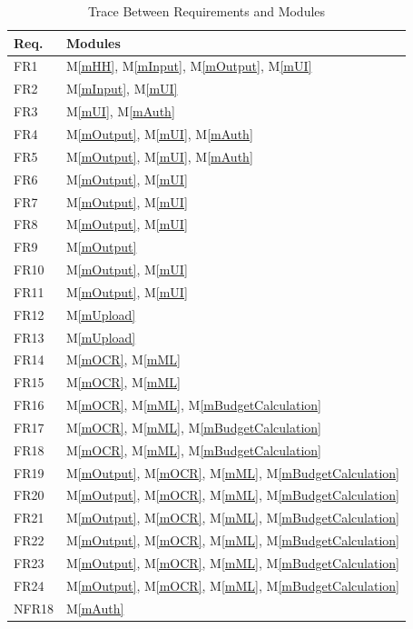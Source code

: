 \documentclass[12pt, titlepage]{article}
\newcommand{\mref}[1]{M\ref{#1}}
\begin{document}
\begin{table}[H]
\caption{Trace Between Requirements and Modules}
\centering
\begin{tabular}{p{} p{}}
\toprule
\textbf{Req.} & \textbf{Modules}\\
\midrule
FR1 & \mref{mHH}, \mref{mInput}, \mref{mOutput}, \mref{mUI}\\
FR2 & \mref{mInput}, \mref{mUI}\\
FR3 & \mref{mUI}, \mref{mAuth}\\
FR4 & \mref{mOutput}, \mref{mUI}, \mref{mAuth}\\
FR5 & \mref{mOutput}, \mref{mUI}, \mref{mAuth}\\
FR6 & \mref{mOutput}, \mref{mUI}\\
FR7 & \mref{mOutput}, \mref{mUI}\\
FR8 & \mref{mOutput}, \mref{mUI}\\
FR9 & \mref{mOutput}\\
FR10 & \mref{mOutput}, \mref{mUI}\\
FR11 & \mref{mOutput}, \mref{mUI}\\
FR12 & \mref{mUpload}\\
FR13 & \mref{mUpload}\\
FR14 & \mref{mOCR}, \mref{mML}\\
FR15 & \mref{mOCR}, \mref{mML}\\
FR16 & \mref{mOCR}, \mref{mML}, \mref{mBudgetCalculation}\\
FR17 & \mref{mOCR}, \mref{mML}, \mref{mBudgetCalculation}\\
FR18 & \mref{mOCR}, \mref{mML}, \mref{mBudgetCalculation}\\
FR19 & \mref{mOutput}, \mref{mOCR}, \mref{mML}, \mref{mBudgetCalculation}\\
FR20 & \mref{mOutput}, \mref{mOCR}, \mref{mML}, \mref{mBudgetCalculation}\\
FR21 & \mref{mOutput}, \mref{mOCR}, \mref{mML}, \mref{mBudgetCalculation}\\
FR22 & \mref{mOutput}, \mref{mOCR}, \mref{mML}, \mref{mBudgetCalculation}\\
FR23 & \mref{mOutput}, \mref{mOCR}, \mref{mML}, \mref{mBudgetCalculation}\\
FR24 & \mref{mOutput}, \mref{mOCR}, \mref{mML}, \mref{mBudgetCalculation}\\
NFR18 & \mref{mAuth}\\

\bottomrule
\end{tabular}
\label{TblRT}
\end{table}
\end{document}
